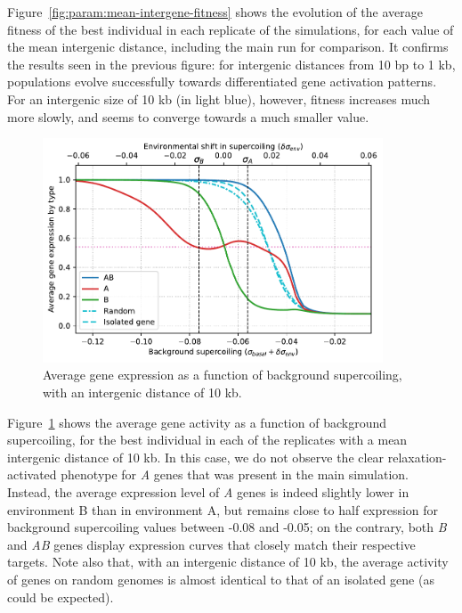 Figure~\ref{fig:param:mean-intergene-fitness} shows the evolution of the average fitness of the best individual in each replicate of the simulations, for each value of the mean intergenic distance, including the main run for comparison.
It confirms the results seen in the previous figure: for intergenic distances from 10 bp to 1 kb, populations evolve successfully towards differentiated gene activation patterns.
For an intergenic size of 10 kb (in light blue), however, fitness increases much more slowly, and seems to converge towards a much smaller value.

\begin{figure}[H]
\centering
\includegraphics[width=0.9\textwidth]{param/mean-intergene/inter-10k/activity_sigmas_avg.pdf}
\caption[Average gene expression as a function of background supercoiling, with an intergenic distance of 10 kb]{Average gene expression as a function of background supercoiling, with an intergenic distance of 10 kb.}
\label{fig:param:mean-intergene-10kb-activ-by-sigma}
\end{figure}

Figure~\ref{fig:param:mean-intergene-10kb-activ-by-sigma} shows the average gene activity as a function of background supercoiling, for the best individual in each of the replicates with a mean intergenic distance of 10 kb.
In this case, we do not observe the clear relaxation-activated phenotype for \emph{A} genes that was present in the main simulation.
Instead, the average expression level of \emph{A} genes is indeed slightly lower in environment B than in environment A, but remains close to half expression for background supercoiling values between -0.08 and -0.05; on the contrary, both \emph{B} and \emph{AB} genes display expression curves that closely match their respective targets.
Note also that, with an intergenic distance of 10 kb, the average activity of genes on random genomes is almost identical to that of an isolated gene (as could be expected).

